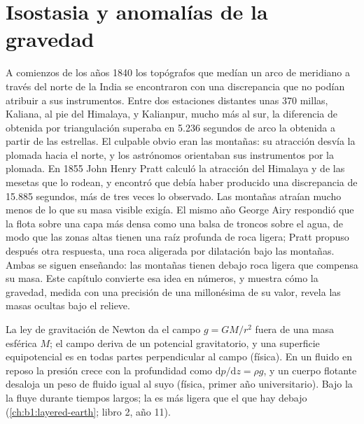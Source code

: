 \chapter{Isostasia y anomalías de la gravedad}\label{ch:b1:isostasy-gravity}

A comienzos de los años 1840 los topógrafos que medían un arco de meridiano a través del norte de la India se encontraron con una
discrepancia que no podían atribuir a sus instrumentos. Entre dos estaciones distantes unas 370 millas, Kaliana, al pie del
Himalaya, y Kalianpur, mucho más al sur, la diferencia de  obtenida por triangulación superaba en 5.236 segundos de arco la
obtenida a partir de las estrellas. El culpable obvio eran las montañas: su atracción desvía la plomada hacia el norte, y los
astrónomos orientaban sus instrumentos por la plomada. En 1855 John Henry Pratt calculó la atracción del Himalaya y de las mesetas
que lo rodean, y encontró que debía haber producido una discrepancia de 15.885 segundos, más de tres veces lo observado. Las
montañas atraían mucho menos de lo que su masa visible exigía. El mismo año George Airy respondió que la  flota sobre una
capa más densa como una balsa de troncos sobre el agua, de modo que las zonas altas tienen una raíz profunda de roca ligera; Pratt
propuso después otra respuesta, una roca aligerada por dilatación bajo las montañas. Ambas se siguen enseñando: las montañas tienen
debajo roca ligera que compensa su masa. Este capítulo convierte esa idea en números, y muestra cómo la gravedad, medida con una
precisión de una millonésima de su valor, revela las masas ocultas bajo el relieve.

\begin{recall}
La ley de gravitación de Newton da el campo $g = GM/r^2$ fuera de una masa esférica $M$; el campo deriva de un potencial
gravitatorio, y una superficie equipotencial es en todas partes perpendicular al campo (física). En un fluido en reposo la presión
crece con la profundidad como $\mathrm dp/\mathrm dz = \rho g$, y un cuerpo flotante desaloja un peso de fluido igual al suyo
(física, primer año universitario). Bajo la  la  fluye durante tiempos largos; la  es más ligera que el
 que hay debajo (\cref{ch:b1:layered-earth}; libro 2, año 11).
\end{recall}

